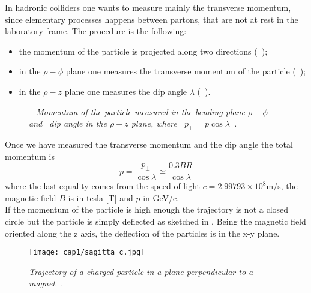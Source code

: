 In hadronic colliders one wants to measure mainly the transverse momentum, since
elementary processes happens between partons, that are not at rest in the
laboratory frame. The procedure is the following:
\begin{itemize}
\item the momentum of the particle is projected along two directions
  (~);
\item in the $\rho-\phi$ plane one measures the transverse momentum of the
  particle (~);
\item in the $\rho-z$ plane one measures the dip angle $\lambda$
  (~).
\end{itemize}
\begin{figure}
  \centering {}
  \caption{\textit{~ Momentum of the particle
      measured in the bending plane $\rho-\phi$
      and~ dip angle in the $\rho-z$ plane,
      where~
      $p_{\perp}=p\cos \lambda$~\cite{Ragusa}.}}\label{momentum_measurement}
\end{figure}
Once we have measured the transverse momentum and the dip angle the total
momentum is
\begin{equation}\label{total_momentum}
  p=\frac{p_{\perp}}{\cos \lambda}\simeq \frac{0.3BR}{\cos \lambda}
\end{equation}
where the last equality comes from the speed of light $c=2.99793\times 10^8$m/s,
the magnetic field $B$ is in tesla [T] and
$p$ in GeV/c.\\
If the momentum of the particle is high enough the trajectory is not a closed
circle but the particle is simply deflected as sketched in
. Being the magnetic field oriented along the z
axis, the deflection of the particles is in the x-y plane.\\
\begin{figure}[!htbp]
  \centering\texttt{[image: cap1/sagitta\_c.jpg]}
  \caption{\textit{Trajectory of a charged particle in a plane perpendicular to
      a magnet~\cite{Grupen}.}}\label{sagitta_c}
\end{figure}
